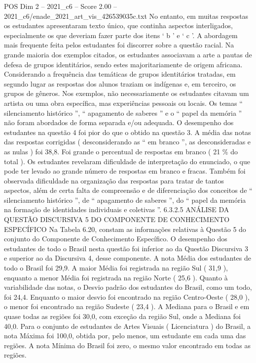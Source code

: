 \begin{textsample}{POS Dim 2 – 2021\_c6 – Score 2.00 – 2021\_c6/enade\_2021\_art\_vis\_426539035c.txt}
No entanto, em muitas respostas os estudantes apresentaram texto único, que continha aspectos interligados, especialmente os que deveriam fazer parte dos itens ‘ b ’ e ‘ c ’.
A abordagem mais frequente feita pelos estudantes foi discorrer sobre a questão racial.
Na grande maioria dos exemplos citados, os estudantes associavam a arte a pautas de defesa de grupos identitários, sendo estes majoritariamente de origem africana.
Considerando a frequência das temáticas de grupos identitários tratadas, em segundo lugar as respostas dos alunos traziam os indígenas e, em terceiro, os grupos de gêneros.
Nos exemplos, não necessariamente os estudantes citavam um artista ou uma obra específica, mas experiências pessoais ou locais.
Os temas “ silenciamento histórico ”, “ apagamento de saberes ” e o “ papel da memória ” não foram abordados de forma separada e/ou adequada.
O desempenho dos estudantes na questão 4 foi pior do que o obtido na questão 3.
A média das notas das respostas corrigidas ( desconsiderando as “ em branco ”, as desconsideradas e as nulas ) foi 38,8.
Foi grande o percentual de respostas em branco ( 21 \% do total ).
Os estudantes revelaram dificuldade de interpretação do enunciado, o que pode ter levado ao grande número de respostas em branco e fracas.
Também foi observada dificuldade na organização das respostas para tratar de tantos aspectos, além de certa falta de compreensão e de diferenciação dos conceitos de “ silenciamento histórico ”, de “ apagamento de saberes ”, do “ papel da memória na formação de identidades individuais e coletivas ”. 6.3.2.5 ANÁLISE DA QUESTÃO DISCURSIVA 5 DO COMPONENTE DE CONHECIMENTO ESPECÍFICO Na Tabela 6.20, constam as informações relativas à Questão 5 do conjunto do Componente de Conhecimento Específico.
O desempenho dos estudantes de todo o Brasil nesta questão foi inferior ao da Questão Discursiva 3 e superior ao da Discursiva 4, desse componente.
A nota Média dos estudantes de todo o Brasil foi 29,9.
A maior Média foi registrada na região Sul ( 31,9 ), enquanto a menor Média foi registrada na região Norte ( 25,6 ).
Quanto à variabilidade das notas, o Desvio padrão dos estudantes do Brasil, como um todo, foi 24,4.
Enquanto o maior desvio foi encontrado na região Centro-Oeste ( 28,0 ), o menor foi encontrado na região Sudeste ( 23,4 ).
A Mediana para o Brasil e em quase todas as regiões foi 30,0, com exceção da região Sul, onde a Mediana foi 40,0.
Para o conjunto de estudantes de Artes Visuais ( Licenciatura ) do Brasil, a nota Máxima foi 100,0, obtida por, pelo menos, um estudante em cada uma das regiões.
A nota Mínima do Brasil foi zero, o mesmo valor encontrado em todas as regiões.

\end{textsample}
